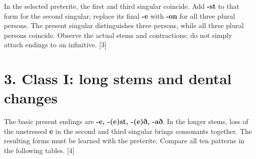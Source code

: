In the selected preterite, the first and third singular coincide. Add \textbf{-st} to that form for the second singular; replace its final \textbf{-e} with \textbf{-on} for all three plural persons. The present singular distinguishes three persons, while all three plural persons coincide. Observe the actual stems and contractions; do not simply attach endings to an infinitive. [3]

\section*{3. Class I: long stems and dental changes}

The basic present endings are \textbf{-e, -(e)st, -(e)ð, -að}. In the longer stems, loss of the unstressed \textbf{e} in the second and third singular brings consonants together. The resulting forms must be learned with the preterite. Compare all ten patterns in the following tables. [4]

